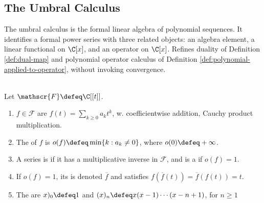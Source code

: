 \subsection{The Umbral Calculus}



The umbral calculus is the formal linear algebra of polynomial sequences. It identifies a formal power series with three related objects: an algebra element, a linear functional on $\C[x]$, and an operator on $\C[x]$. Refines duality of Definition \ref{def:dual-map} and polynomial operator calculus of Definition \ref{def:polynomial-applied-to-operator}, without invoking convergence.

\begin{definition} \label{def:formal-power-series-umbral-calculus} \\
Let $\mathscr{F}\defeq\C[[t]]$.
\begin{enumerate}[label=(\roman*)]
\setlength{\itemsep}{0pt}
\item $f \in \mathscr{F}$ are  $f(t)=\sum\limits_{k\geq0}a_kt^k$, w. coefficientwise addition, Cauchy product multiplication.
\item The  of $f$ is $o(f)\defeq \min\{k:a_k\neq0\}$, where $o(0)\defeq+\infty$.
\item A series is  if it has a multiplicative inverse in $\mathscr{F}$, and is a  if $o(f)=1$.
\item If $o(f)=1$, its  is denoted $\overline f$ and satisfies $f(\overline f(t))=\overline f(f(t))=t$.
\item The  are $x)_0\defeq1$ and $(x)_n\defeq x(x-1)\cdots(x-n+1)$, for $n\geq1$
\end{enumerate}
\end{definition}

